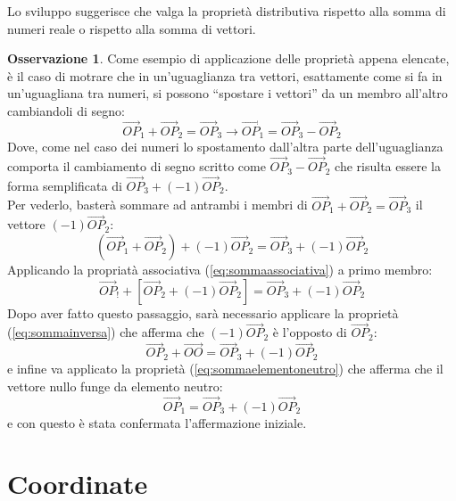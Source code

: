 \documentclass{book}
\theoremstyle{definition}
\newtheorem{oss}{Osservazione}[section]
\theoremstyle{plain}
\begin{document}
Lo sviluppo suggerisce che valga la proprietà distributiva rispetto alla somma di numeri reale o rispetto alla somma di vettori.
\begin{oss}
  \label{oss:vettgeo1}
  Come esempio di applicazione delle proprietà appena elencate, è il caso di motrare che in un'uguaglianza tra vettori, esattamente come si fa in un'uguagliana tra numeri, si possono ``spostare i vettori'' da un membro all'altro cambiandoli di segno:
  \begin{equation*}
    \vec{OP}_1+\vec{OP}_2=\vec{OP}_3 \to \vec{OP}_1=\vec{OP}_3-\vec{OP}_2
  \end{equation*}
  Dove, come nel caso dei numeri lo spostamento dall'altra parte dell'uguaglianza comporta il cambiamento di segno scritto come $\vec{OP}_3-\vec{OP}_2$ che risulta essere la forma semplificata di $\vec{OP}_3+(-1)\vec{OP}_2$.\\
  Per vederlo, basterà sommare ad antrambi i membri di $\vec{OP}_1+\vec{OP}_2=\vec{OP}_3$ il vettore $(-1)\vec{OP}_2$:
  \begin{equation*}
    (\vec{OP}_1+\vec{OP}_2)+(-1)\vec{OP}_2=\vec{OP}_3+(-1)\vec{OP}_2
  \end{equation*}
  Applicando la propriatà associativa (\ref{eq:sommaassociativa}) a primo membro:
  \begin{equation*}
    \vec{OP}_!+\left[\vec{OP}_2+(-1)\vec{OP}_2\right]=\vec{OP}_3+(-1)\vec{OP}_2
  \end{equation*}
  Dopo aver fatto questo passaggio, sarà necessario applicare la proprietà (\ref{eq:sommainversa}) che afferma che $(-1)\vec{OP}_2$ è l'opposto di $\vec{OP}_2$:
  \begin{equation*}
    \vec{OP}_2+\vec{OO}=\vec{OP}_3+(-1)\vec{OP}_2
  \end{equation*}
  e infine va applicato la proprietà (\ref{eq:sommaelementoneutro}) che afferma che il vettore nullo funge da elemento neutro:
  \begin{equation*}
    \vec{OP}_1=\vec{OP}_3+(-1)\vec{OP}_2
  \end{equation*}
  e con questo è stata confermata l'affermazione iniziale.
\end{oss}

\section{Coordinate}
\label{sec:coordinate}
\end{document}
